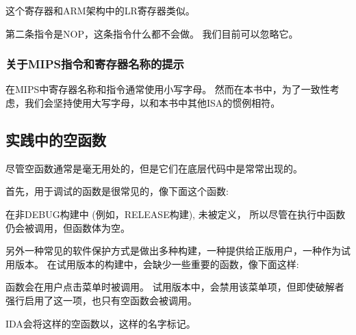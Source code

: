 这个寄存器和ARM架构中的\ac{LR}寄存器类似。

第二条指令是\ac{NOP}，这条指令什么都不会做。
我们目前可以忽略它。

\subsubsection{关于MIPS指令和寄存器名称的提示}

在MIPS中寄存器名称和指令通常使用小写字母。
然而在本书中，为了一致性考虑，我们会坚持使用大写字母，以和本书中其他\ac{ISA}的惯例相符。

\subsection{实践中的空函数}

尽管空函数通常是毫无用处的，但是它们在底层代码中是常常出现的。

首先，用于调试的函数是很常见的，像下面这个函数:



在非DEBUG构建中 (例如，RELEASE构建), 未被定义，
所以尽管在执行中函数仍会被调用，但函数体为空。

另外一种常见的软件保护方式是做出多种构建，一种提供给正版用户，一种作为试用版本。
在试用版本的构建中，会缺少一些重要的函数，像下面这样:



 函数会在用户点击菜单时被调用。
试用版本中，会禁用该菜单项，但即使破解者强行启用了这一项，也只有空函数会被调用。

IDA会将这样的空函数以，这样的名字标记。

